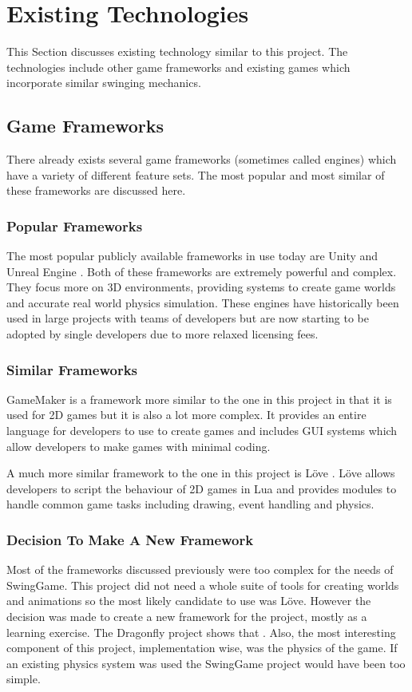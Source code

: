 \documentclass[]{report}
\begin{document}
	\section{Existing Technologies}
	This Section discusses existing technology similar to this project. The technologies include other game frameworks and existing games which incorporate similar swinging mechanics.
		\subsection{Game Frameworks}
		There already exists several game frameworks (sometimes called engines) which have a variety of different feature sets. The most popular and most similar of these frameworks are discussed here.
			\subsubsection{Popular Frameworks}
			The most popular publicly available frameworks in use today are Unity \cite{unity} and Unreal Engine \cite{unreal}. Both of these frameworks are extremely powerful and complex. They focus more on 3D environments, providing systems to create game worlds and accurate real world physics simulation. These engines have historically been used in large projects with teams of developers but are now starting to be adopted by single developers due to more relaxed licensing fees.
			\subsubsection{Similar Frameworks}
			GameMaker \cite{gamemaker} is a framework more similar to the one in this project in that it is used for 2D games but it is also a lot more complex. It provides an entire language for developers to use to create games and includes GUI systems which allow developers to make games with minimal coding.
			
			A much more similar framework to the one in this project is Löve \cite{love}. Löve allows developers to script the behaviour of 2D games in Lua and provides modules to handle common game tasks including drawing, event handling and physics.
			\subsubsection{Decision To Make A New Framework}
			Most of the frameworks discussed previously were too complex for the needs of SwingGame. This project did not need a whole suite of tools for creating worlds and animations so the most likely candidate to use was Löve. However the decision was made to create a new framework for the project, mostly as a learning exercise. The Dragonfly project shows that  \cite{dragonfly}. Also, the most interesting component of this project, implementation wise, was the physics of the game. If an existing physics system was used the SwingGame project would have been too simple.
			
\end{document}
